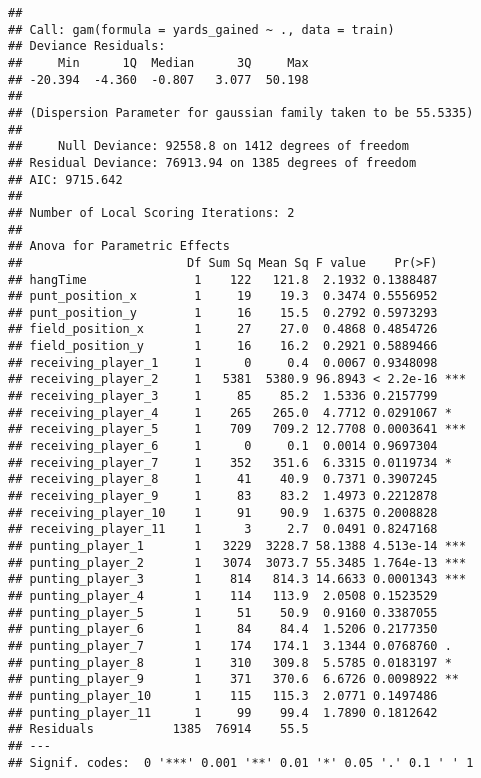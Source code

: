 \documentclass[
]{article}
\begin{document}
\begin{verbatim}
## 
## Call: gam(formula = yards_gained ~ ., data = train)
## Deviance Residuals:
##     Min      1Q  Median      3Q     Max 
## -20.394  -4.360  -0.807   3.077  50.198 
## 
## (Dispersion Parameter for gaussian family taken to be 55.5335)
## 
##     Null Deviance: 92558.8 on 1412 degrees of freedom
## Residual Deviance: 76913.94 on 1385 degrees of freedom
## AIC: 9715.642 
## 
## Number of Local Scoring Iterations: 2 
## 
## Anova for Parametric Effects
##                       Df Sum Sq Mean Sq F value    Pr(>F)    
## hangTime               1    122   121.8  2.1932 0.1388487    
## punt_position_x        1     19    19.3  0.3474 0.5556952    
## punt_position_y        1     16    15.5  0.2792 0.5973293    
## field_position_x       1     27    27.0  0.4868 0.4854726    
## field_position_y       1     16    16.2  0.2921 0.5889466    
## receiving_player_1     1      0     0.4  0.0067 0.9348098    
## receiving_player_2     1   5381  5380.9 96.8943 < 2.2e-16 ***
## receiving_player_3     1     85    85.2  1.5336 0.2157799    
## receiving_player_4     1    265   265.0  4.7712 0.0291067 *  
## receiving_player_5     1    709   709.2 12.7708 0.0003641 ***
## receiving_player_6     1      0     0.1  0.0014 0.9697304    
## receiving_player_7     1    352   351.6  6.3315 0.0119734 *  
## receiving_player_8     1     41    40.9  0.7371 0.3907245    
## receiving_player_9     1     83    83.2  1.4973 0.2212878    
## receiving_player_10    1     91    90.9  1.6375 0.2008828    
## receiving_player_11    1      3     2.7  0.0491 0.8247168    
## punting_player_1       1   3229  3228.7 58.1388 4.513e-14 ***
## punting_player_2       1   3074  3073.7 55.3485 1.764e-13 ***
## punting_player_3       1    814   814.3 14.6633 0.0001343 ***
## punting_player_4       1    114   113.9  2.0508 0.1523529    
## punting_player_5       1     51    50.9  0.9160 0.3387055    
## punting_player_6       1     84    84.4  1.5206 0.2177350    
## punting_player_7       1    174   174.1  3.1344 0.0768760 .  
## punting_player_8       1    310   309.8  5.5785 0.0183197 *  
## punting_player_9       1    371   370.6  6.6726 0.0098922 ** 
## punting_player_10      1    115   115.3  2.0771 0.1497486    
## punting_player_11      1     99    99.4  1.7890 0.1812642    
## Residuals           1385  76914    55.5                      
## ---
## Signif. codes:  0 '***' 0.001 '**' 0.01 '*' 0.05 '.' 0.1 ' ' 1
\end{verbatim}
\end{document}
